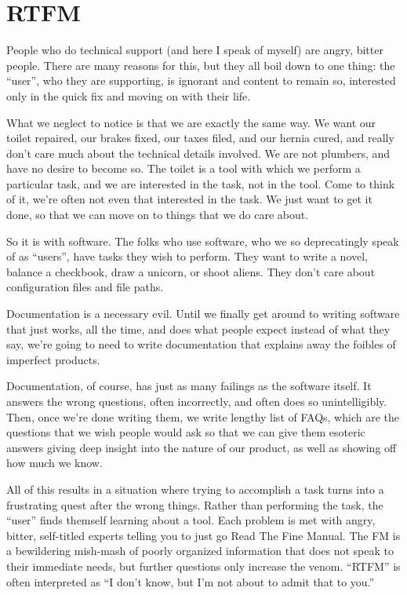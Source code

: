 \chapter{RTFM}

People who do technical support (and here I speak of myself)
are angry, bitter people. There are many
reasons for this, but they all boil down to one thing: the ``user'', who
they are supporting, is ignorant and content to remain so, interested
only in the quick fix and moving on with their life.

What we neglect to notice is that we are exactly the same way. We want
our toilet repaired, our brakes fixed, our taxes filed, and our hernia
cured, and really don't care much about the technical details involved.
We are not plumbers, and have no desire to become so. The toilet is a tool
with which we perform a particular task, and we are interested in the
task, not in the tool. Come to think of it, we're often not even that
interested in the task. We just want to get it done, so that we can move
on to things that we do care about.

So it is with software. The folks who use software, who we so
deprecatingly speak of as ``users'', have tasks they wish to perform.
They want to write a novel, balance a checkbook, draw a unicorn, or
shoot aliens. They don't care about configuration files and file paths.

Documentation is a necessary evil. Until we finally get around to
writing software that just works, all the time, and does what people
expect instead of what they say, we're going to need to write
documentation that explains away the foibles of imperfect products.

Documentation, of course, has just as many failings as the software
itself. It answers the wrong questions, often incorrectly, and often
does so unintelligibly. Then, once we're done writing them, we write
lengthy list of FAQs, which are the questions that we wish people would
ask so that we can give them esoteric answers giving deep insight into
the nature of our product, as well as showing off how much we know.

All of this results in a situation where trying to accomplish a task
turns into a frustrating quest after the wrong things. Rather than 
performing the task, the ``user'' finds themself learning about a tool.
Each problem is met with angry, bitter,
self-titled experts telling you to just go Read The Fine Manual. The FM
is a bewildering mish-mash of poorly organized information that does not
speak to their immediate needs, but further questions only increase the
venom. ``RTFM'' is often interpreted as ``I don't know, but I'm not
about to admit that to you.''

